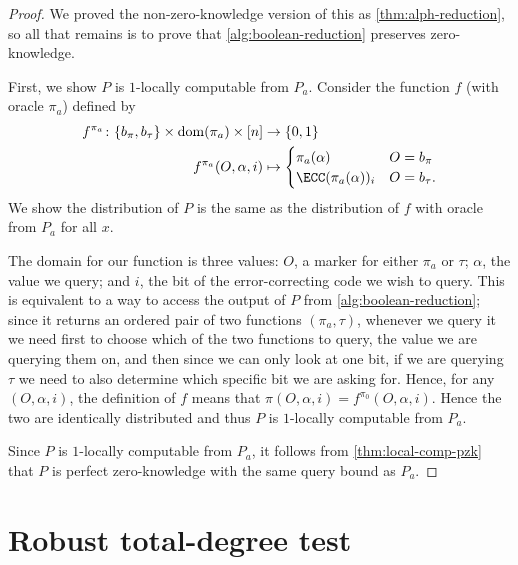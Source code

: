 \documentclass[english,12pt]{reedthesis}
\theoremstyle{plain}
\theoremstyle{definition}
\theoremstyle{remark}
\DeclareMathOperator{\dom}{dom}
\begin{document}
\begin{proof}
  We proved the non-zero-knowledge version of this as \cref{thm:alph-reduction},
  so all that remains is to prove that \cref{alg:boolean-reduction} preserves
  zero-knowledge.

  First, we show $P$ is $1$-locally computable from $P_{a}$. Consider the
  function $f$ (with oracle $\pi_{a}$) defined by
  \begin{equation}\label{eqn:local-alph-red}
    \begin{aligned}
      f^{\pi_{a}}\colon \{b_{\pi}, b_{\tau}\} \times \dom(\pi_{a}) \times [n] &\rightarrow \{0, 1\} \\
      f^{\pi_{a}}(O, \alpha, i) &\mapsto \begin{cases}
        \pi_{a}(\alpha) & O = b_{\pi} \\
        \ECC(\pi_{a}(\alpha))_{i} & O = b_{\tau}.
      \end{cases}
    \end{aligned}
  \end{equation}
  We show the distribution of $P$ is the same as the distribution of $f$ with
  oracle from $P_{a}$ for all $x$.

  The domain for our function is three values: $O$, a marker for either $\pi_{a}$
  or $\tau$; $\alpha$, the value we query; and $i$, the bit of the error-correcting code
  we wish to query. This is equivalent to a way to access the output of $P$ from
  \cref{alg:boolean-reduction}; since it returns an ordered pair of two
  functions $(\pi_{a}, \tau)$, whenever we query it we need first to choose which of
  the two functions to query, the value we are querying them on, and then since
  we can only look at one bit, if we are querying $\tau$ we need to also determine
  which specific bit we are asking for. Hence, for any $(O, \alpha, i)$, the
  definition of $f$ means that $\pi(O, \alpha, i) = f^{\pi_{0}}(O, \alpha, i)$. Hence the two
  are identically distributed and thus $P$ is $1$-locally computable from
  $P_{a}$.

  Since $P$ is $1$-locally computable from $P_{a}$, it follows from
  \cref{thm:local-comp-pzk} that $P$ is perfect zero-knowledge with the same
  query bound as $P_{a}$.
\end{proof}

\section{Robust total-degree test}\label{sec:robust-degree}
\end{document}
